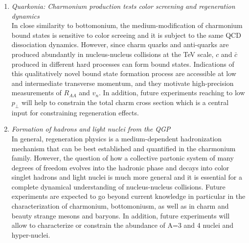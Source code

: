 \documentclass[../report.tex]{subfiles}
\begin{document}
\begin{enumerate}
\item {\it Quarkonia: Charmonium production tests color screening and regeneration dynamics}\\ In close similarity to bottomonium, the medium-modification of charmonium bound states is sensitive to color screeing and it is subject to the same QCD dissociation dynamics. However, since charm quarks and anti-quarks are produced abundantly in nucleus-nucleus collisions at the TeV scale, $c$ and $\bar c$ produced in different hard processes can form bound states. Indications of this qualitatively novel bound state formation process are accessible at low and intermediate transverse momentum, and they motivate high-precision measurements of $R_{AA}$ and $v_n$. In addition, future experiments reaching to low $p_\perp$ will help to constrain the total charm cross section which is a central input for constraining regeneration effects. 
\item {\it Formation of hadrons and light nuclei from the QGP}\\ In general, regeneration physics is a medium-dependent hadronization mechanism that can be best  established and quantified in the charmonium family. However, the question of how a collective partonic system of many degrees of freedom evolves into the hadronic phase and decays into color singlet hadrons and light nuclei is much more general and it is essential for a complete dynamical understanding of nucleus-nucleus collisions. Future experiments are expected to go beyond current knowledge in particular in the characterization of charmonium, bottomoniusm, as well as in charm and beauty strange mesons and baryons. In addition, future experiments will allow to characterize or constrain the abundance of A=3 and 4 nuclei and hyper-nuclei. 
\end{enumerate}
\end{document}
